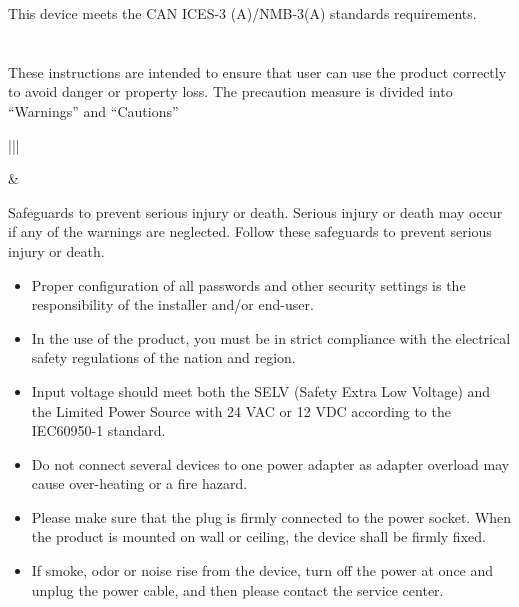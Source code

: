 \documentclass[letterpaper,10pt,openany,oneside,english]{sphinxmanual}
\begin{document}

This device meets the CAN ICES-3 (A)/NMB-3(A) standards requirements.


\section{}
\label{\detokenize{legalandsafety:safety-instruction}}
These instructions are intended to ensure that user can use the product correctly to avoid danger or property loss.
The precaution measure is divided into “Warnings” and “Cautions”


\begin{savenotes}\sphinxattablestart
\centering
\begin{tabular}[t]{|||}
\hline

\noindent{}
&
\\
\hline
\end{tabular}
\par
\sphinxattableend\end{savenotes}

 Safeguards to prevent serious injury or death. Serious injury or death may occur if any of the warnings are neglected. Follow these safeguards to prevent serious injury or death.
\begin{itemize}
\item {} 
Proper configuration of all passwords and other security settings is the responsibility of the installer and/or end-user.

\item {} 
In the use of the product, you must be in strict compliance with the electrical safety regulations of the nation and region.

\item {} 
Input voltage should meet both the SELV (Safety Extra Low Voltage) and the Limited Power Source with 24 VAC or 12 VDC according to the IEC60950-1 standard.

\item {} 
Do not connect several devices to one power adapter as adapter overload may cause over-heating or a fire hazard.

\item {} 
Please make sure that the plug is firmly connected to the power socket. When the product is mounted on wall or ceiling, the device shall be firmly fixed.

\item {} 
If smoke, odor or noise rise from the device, turn off the power at once and unplug the power cable, and then please contact the service center.

\end{itemize}
\end{document}

